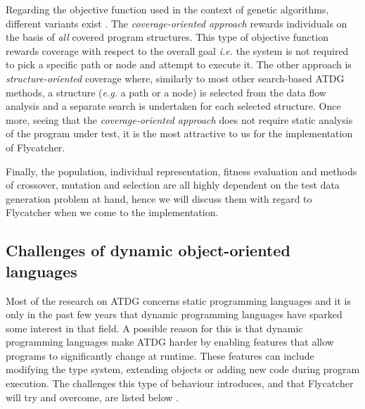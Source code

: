 \documentclass[a4paper,11pt,titlepage]{report}
\begin{document}
Regarding the objective function used in the context of genetic algorithms, different variants exist \cite{mcminn2004search}. The \emph{coverage-oriented approach} rewards individuals on the basis of \emph{all} covered program structures. This type of objective function rewards coverage with respect to the overall goal \emph{i.e.} the system is not required to pick a specific path or node and attempt to execute it. The other approach is \emph{structure-oriented} coverage where, similarly to most other search-based ATDG methods, a structure (\emph{e.g.} a path or a node) is selected from the data flow analysis and a separate search is undertaken for each selected structure. Once more, seeing that the \emph{coverage-oriented approach} does not require static analysis of the program under test, it is the most attractive to us for the implementation of Flycatcher.

Finally, the population, individual representation, fitness evaluation and methods of crossover, mutation and selection are all highly dependent on the test data generation problem at hand, hence we will discuss them with regard to Flycatcher when we come to the implementation.






\subsection{Challenges of dynamic object-oriented languages}

Most of the research on ATDG concerns static programming languages \cite{mahmood2007systematic} and it is only in the past few years that dynamic programming languages have sparked some interest in that field. A possible reason for this is that dynamic programming languages make ATDG harder by enabling features that allow programs to significantly change at runtime. These features can include modifying the type system, extending objects or adding new code during program execution. The challenges this type of behaviour introduces, and that Flycatcher will try and overcome, are listed below \cite{ducasse2011challenges}.
\end{document}
